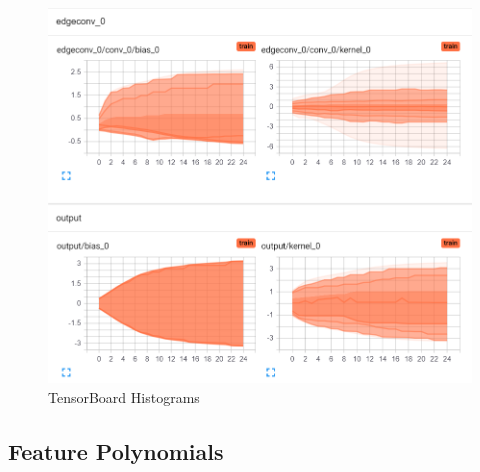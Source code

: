 \begin{figure}[H]
    \centering
    \includegraphics[width=0.8\linewidth]{img/simplify-particle-net/distributions.png}
    \caption{TensorBoard Histograms}
\end{figure}


\subsection{Feature Polynomials}

